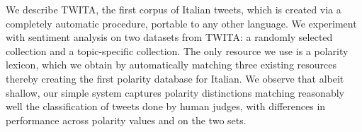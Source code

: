 We describe TWITA, the first corpus of Italian tweets, which is created via a completely automatic procedure, portable to any other language.
 We experiment with sentiment analysis on two datasets from TWITA: a
 randomly selected collection and a topic-specific collection. The only resource
 we use is a polarity lexicon, which we obtain by automatically matching three
 existing resources thereby creating the first polarity database for Italian. We
 observe that albeit shallow, our simple system captures polarity distinctions
 matching reasonably well the classification of tweets done by human judges,
 with differences in performance across polarity values and on the two sets.


